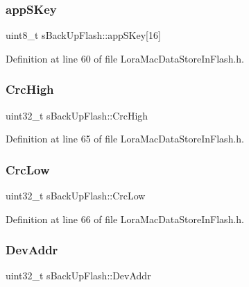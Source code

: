 \subsubsection{\texorpdfstring{app\+S\+Key}{appSKey}}
{\footnotesize\ttfamily uint8\+\_\+t s\+Back\+Up\+Flash\+::app\+S\+Key\mbox{[}16\mbox{]}}



Definition at line 60 of file Lora\+Mac\+Data\+Store\+In\+Flash.\+h.

\mbox{\label{structs_back_up_flash_afc534d9e7a3e581783489765b52676a0}} 
\subsubsection{\texorpdfstring{Crc\+High}{CrcHigh}}
{\footnotesize\ttfamily uint32\+\_\+t s\+Back\+Up\+Flash\+::\+Crc\+High}



Definition at line 65 of file Lora\+Mac\+Data\+Store\+In\+Flash.\+h.

\mbox{\label{structs_back_up_flash_a24f57cec1c39d4972d14bfb65212d74c}} 
\subsubsection{\texorpdfstring{Crc\+Low}{CrcLow}}
{\footnotesize\ttfamily uint32\+\_\+t s\+Back\+Up\+Flash\+::\+Crc\+Low}



Definition at line 66 of file Lora\+Mac\+Data\+Store\+In\+Flash.\+h.

\mbox{\label{structs_back_up_flash_a2032fb8ac149ddbdd397b070d46c6fda}} 
\subsubsection{\texorpdfstring{Dev\+Addr}{DevAddr}}
{\footnotesize\ttfamily uint32\+\_\+t s\+Back\+Up\+Flash\+::\+Dev\+Addr}



